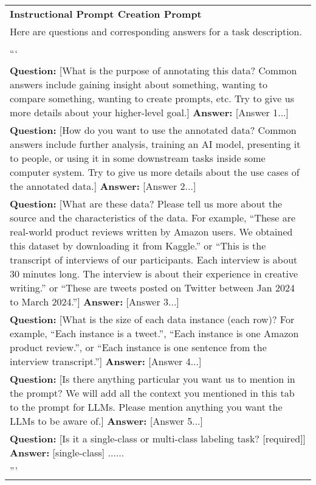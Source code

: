 \begin{table*}[h]
\centering
    \begin{tabular}{@{}p{\textwidth}@{}}
        \hline
        \textbf{Instructional Prompt Creation Prompt} \\
        Here are questions and corresponding answers for a task description.\\ \\

        ```\\
        \textbf{Question:} [What is the purpose of annotating this data? Common answers include gaining insight about something, wanting to compare something, wanting to create prompts, etc. Try to give us more details about your higher-level goal.] \textbf{Answer:} [Answer 1...] \\
        \textbf{Question:} [How do you want to use the annotated data? Common answers include further analysis, training an AI model, presenting it to people, or using it in some downstream tasks inside some computer system. Try to give us more details about the use cases of the annotated data.] \textbf{Answer:} [Answer 2...] \\
        \textbf{Question:} [What are these data? Please tell us more about the source and the characteristics of the data. For example, ``These are real-world product reviews written by Amazon users. We obtained this dataset by downloading it from Kaggle.'' or ``This is the transcript of interviews of our participants. Each interview is about 30 minutes long. The interview is about their experience in creative writing.'' or ``These are tweets posted on Twitter between Jan 2024 to March 2024.''] \textbf{Answer:} [Answer 3...] \\
        \textbf{Question:} [What is the size of each data instance (each row)? For example, ``Each instance is a tweet.'', ``Each instance is one Amazon product review.'', or ``Each instance is one sentence from the interview transcript.''] \textbf{Answer:} [Answer 4...] \\
        \textbf{Question:} [Is there anything particular you want us to mention in the prompt? We will add all the context you mentioned in this tab to the prompt for LLMs. Please mention anything you want the LLMs to be aware of.] \textbf{Answer:} [Answer 5...] \\
        \textbf{Question:} [Is it a single-class or multi-class labeling task? [required]] \textbf{Answer:} [single-class]
        ......\\
        '''\\

\end{tabular}
\end{table*}
